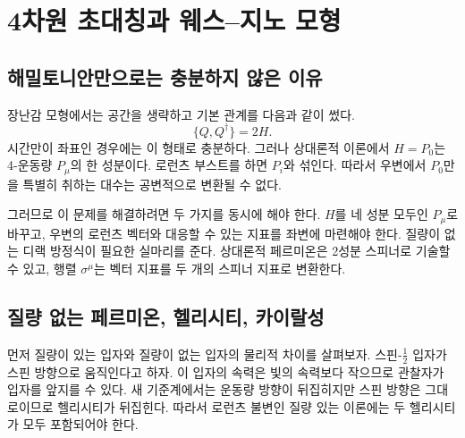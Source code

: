 \chapter{4차원 초대칭과 웨스--지노 모형}


\section{해밀토니안만으로는 충분하지 않은 이유}

장난감 모형에서는 공간을 생략하고 기본 관계를 다음과 같이 썼다.
\begin{equation}
\{Q,Q^\dagger\}=2H.
\label{eq:l8-time-only-algebra}
\end{equation}
시간만이 좌표인 경우에는 이 형태로 충분하다. 그러나 상대론적 이론에서 \(H=P_0\)는 4-운동량 \(P_\mu\)의 한 성분이다. 로런츠 부스트를 하면 \(P_i\)와 섞인다. 따라서 우변에서 \(P_0\)만을 특별히 취하는 대수는 공변적으로 변환될 수 없다.

그러므로 이 문제를 해결하려면 두 가지를 동시에 해야 한다. \(H\)를 네 성분 모두인 \(P_\mu\)로 바꾸고, 우변의 로런츠 벡터와 대응할 수 있는 지표를 좌변에 마련해야 한다. 질량이 없는 디랙 방정식이 필요한 실마리를 준다. 상대론적 페르미온은 2성분 스피너로 기술할 수 있고, 행렬 \(\sigma^\mu\)는 벡터 지표를 두 개의 스피너 지표로 변환한다.

\section{질량 없는 페르미온, 헬리시티, 카이랄성}

먼저 질량이 있는 입자와 질량이 없는 입자의 물리적 차이를 살펴보자. 스핀-\(\tfrac12\) 입자가 스핀 방향으로 움직인다고 하자. 이 입자의 속력은 빛의 속력보다 작으므로 관찰자가 입자를 앞지를 수 있다. 새 기준계에서는 운동량 방향이 뒤집히지만 스핀 방향은 그대로이므로 헬리시티가 뒤집힌다. 따라서 로런츠 불변인 질량 있는 이론에는 두 헬리시티가 모두 포함되어야 한다.

